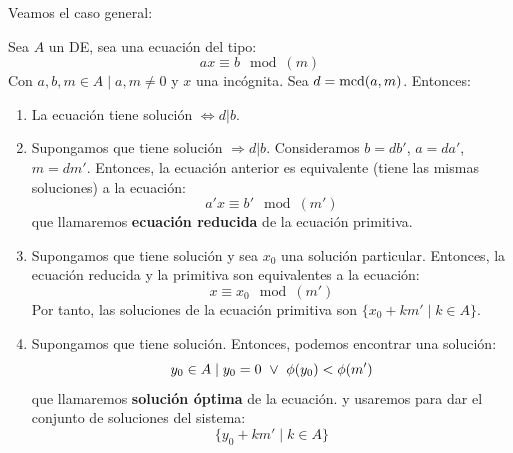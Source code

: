 Veamos el caso general:
\begin{teo}
    \label{teo:ecCongruencia}
    Sea $A$ un DE, sea una ecuación del tipo:
    $$ax\equiv b\mod(m)$$
    Con $a,b,m \in A \mid a,m \neq 0$ y $x$ una incógnita. Sea $d = \operatorname{mcd}(a,m)$. Entonces:
    \begin{enumerate}
        \item La ecuación tiene solución $\Longleftrightarrow d|b$.
        \item Supongamos que tiene solución $\Longrightarrow d|b$. Consideramos $b=db'$, $a=da'$, $m=dm'$. Entonces, la ecuación anterior es equivalente (tiene las mismas soluciones) a la ecuación:
        $$a'x\equiv b'\mod(m')$$
        que llamaremos \textbf{ecuación reducida} de la ecuación primitiva.

        \item Supongamos que tiene solución y sea $x_0$ una solución particular. Entonces, la ecuación reducida y la primitiva son equivalentes a la ecuación:
        $$x\equiv x_0\mod(m')$$
        Por tanto, las soluciones de la ecuación primitiva son $\{x_0 + km' \mid k \in A\}$.

        \item Supongamos que tiene solución. Entonces, podemos encontrar una solución: $$y_0 \in A \mid y_0=0 \ \lor \  \phi(y_0) < \phi(m')$$ que llamaremos \textbf{solución óptima} de la ecuación. y usaremos para dar el conjunto de soluciones del sistema:
        $$\{y_0 + km' \mid k \in A\}$$
    \end{enumerate}
\end{teo}
